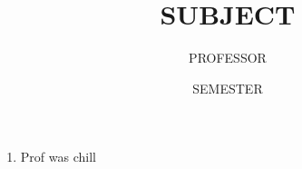 \documentclass{article}
\title{SUBJECT}
\author{PROFESSOR}
\date{SEMESTER}
\begin{document}
\maketitle

\begin{enumerate}
    \item Prof was chill
\end{enumerate}
\end{document}
